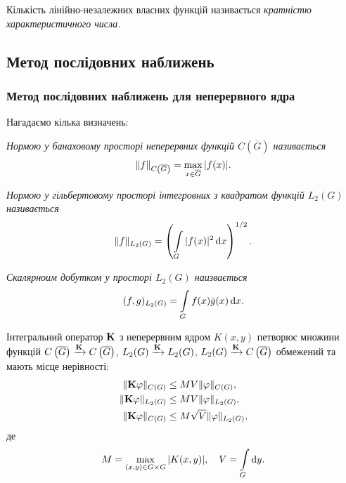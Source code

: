 \begin{definition}
	Кількість лі\-ній\-но-незалежних власних функцій називається \it{кратністю характеристичного числа}.
\end{definition}

\subsection{Метод послідовних наближень}

\subsubsection{Метод послідовних наближень для неперервного ядра}

Нагадаємо кілька визначень:

\begin{definition}
	\it{Нормою} у банаховому просторі неперервних функцій $C\left(\overline G\right)$ називається
	\begin{equation}
		\label{eq:2.1.1}
		\|f\|_{C\left(\overline G\right)} = \Max_{x \in \overline G} |f(x)|.
	\end{equation}
\end{definition}

\begin{definition}[норми у $L_2(G)$]
	\it{Нормою} у гільбертовому просторі інтегровних з квадратом функцій $L_2(G)$ називається
	\begin{equation}
		\label{eq:2.1.2}
		\|f\|_{L_2(G)} = \left( \Int_G |f(x)|^2 \diff x \right)^{1/2}.
	\end{equation}
\end{definition}

\begin{definition}
	\it{Скалярноим добутком} у просторі $L_2(G)$ наизвається
	\begin{equation}
		\label{eq:2.1.3}
		(f, g)_{L_2(G)} = \Int_G f(x) \bar g(x) \diff x.
	\end{equation}
\end{definition}

\begin{lemma} 
	\label{lemma:2.1.4}
	Інтегральний оператор $\bf{K}$ з неперервним ядром $K(x, y)$ петворює множини функцій $C\left(\overline G\right) \xrightarrow{\bf{K}} C\left(\overline G\right)$, $L_2(G) \xrightarrow{\bf{K}} L_2(G)$, $L_2(G) \xrightarrow{\bf{K}} C\left(\overline G\right)$ обмежений та мають місце нерівності:
	\begin{align}
		\label{eq:2.1.4}
		\| \bf{K} \phi \|_{C(G)} &\le M V \| \phi \|_{C(G)}, \\
		\label{eq:2.1.5}
		\| \bf{K} \phi \|_{L_2(G)} &\le M V \| \phi \|_{L_2(G)}, \\
		\label{eq:2.1.6}
		\| \bf{K} \phi \|_{C(G)} &\le M \sqrt{V} \| \phi \|_{L_2(G)},
	\end{align}
	де
	\begin{equation}
		M = \Max_{(x, y) \in G \times G} |K(x, y)|, \quad V = \Int_G \diff y.
	\end{equation}
\end{lemma}

